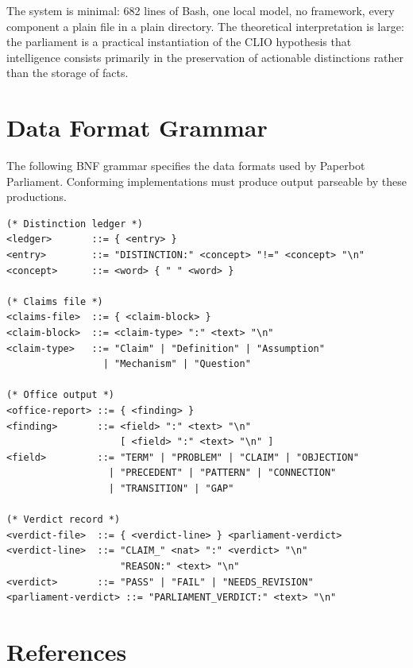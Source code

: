 \documentclass[12pt, a4paper]{article}
\theoremstyle{principle}
\theoremstyle{definition}
\begin{document}
The system is minimal: 682 lines of Bash, one local model, no framework, every
component a plain file in a plain directory. The theoretical interpretation is
large: the parliament is a practical instantiation of the CLIO hypothesis that
intelligence consists primarily in the preservation of actionable distinctions
rather than the storage of facts.

\appendix
\section{Data Format Grammar}

The following BNF grammar specifies the data formats used by Paperbot Parliament.
Conforming implementations must produce output parseable by these productions.

\begin{lstlisting}[language={}, caption={BNF for Parliament data formats}]
(* Distinction ledger *)
<ledger>       ::= { <entry> }
<entry>        ::= "DISTINCTION:" <concept> "!=" <concept> "\n"
<concept>      ::= <word> { " " <word> }

(* Claims file *)
<claims-file>  ::= { <claim-block> }
<claim-block>  ::= <claim-type> ":" <text> "\n"
<claim-type>   ::= "Claim" | "Definition" | "Assumption"
                 | "Mechanism" | "Question"

(* Office output *)
<office-report> ::= { <finding> }
<finding>       ::= <field> ":" <text> "\n"
                    [ <field> ":" <text> "\n" ]
<field>         ::= "TERM" | "PROBLEM" | "CLAIM" | "OBJECTION"
                  | "PRECEDENT" | "PATTERN" | "CONNECTION"
                  | "TRANSITION" | "GAP"

(* Verdict record *)
<verdict-file>  ::= { <verdict-line> } <parliament-verdict>
<verdict-line>  ::= "CLAIM_" <nat> ":" <verdict> "\n"
                    "REASON:" <text> "\n"
<verdict>       ::= "PASS" | "FAIL" | "NEEDS_REVISION"
<parliament-verdict> ::= "PARLIAMENT_VERDICT:" <text> "\n"
\end{lstlisting}

\section*{References}
\end{document}
